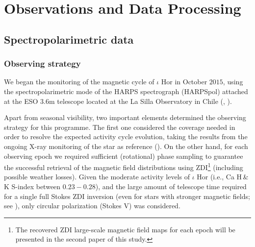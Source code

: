 \documentclass[a4paper,fleqn,usenatbib]{mnras}
\begin{document}
\section{Observations and Data Processing}\label{sect_3}

\subsection{Spectropolarimetric data}

\subsubsection{Observing strategy}\label{sec_strategy}

We began the monitoring of the magnetic cycle of $\iota$ Hor in October $2015$, using the spectropolarimetric mode of the HARPS spectrograph (HARPSpol) attached at the ESO $3.6$m telescope located at the La Silla Observatory in Chile (, ). 

Apart from seasonal visibility, two important elements determined the observing strategy for this programme. The first one considered the coverage needed in order to resolve the expected activity cycle evolution, taking the results from the ongoing X-ray monitoring of the star as reference (). On the other hand, for each observing epoch we required sufficient (rotational) phase sampling to guarantee the successful retrieval of the magnetic field distributions using ZDI\footnote[3]{The recovered ZDI large-scale magnetic field maps for each epoch will be presented in the second paper of this study.} (including possible weather losses). Given the moderate activity levels of $\iota$ Hor (i.e., Ca H\,\&\,K S-index between $0.23-0.28$), and the large amount of telescope time required for a single full Stokes ZDI inversion (even for stars with stronger magnetic fields; see ), only circular polarization (Stokes V) was considered. 
\end{document}
